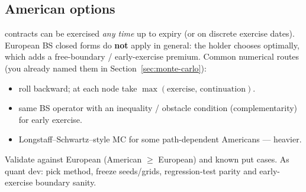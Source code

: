 \subsection{American options}
\label{subsec:american-options}
 contracts can be exercised \emph{any time} up to expiry 
(or on discrete exercise dates). European BS closed forms do \textbf{not} apply 
in general: the holder chooses optimally, which adds a free-boundary / 
early-exercise premium.
\newline
Common numerical routes (you already named them in Section~\ref{sec:monte-carlo}):
\begin{itemize}
    \item {} roll backward; at each node take 
          $\max(\mathrm{exercise},\, \mathrm{continuation})$.
    \item {} same BS operator with an inequality 
          / obstacle condition (complementarity) for early exercise.
    \item Longstaff--Schwartz--style MC for some path-dependent Americans --- heavier.
\end{itemize}
Validate against European (American $\ge$ European) and known put cases. As quant 
dev: pick method, freeze seeds/grids, regression-test parity and early-exercise 
boundary sanity.

